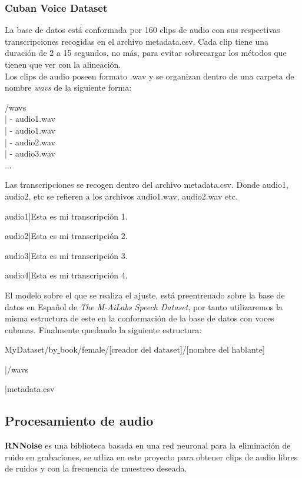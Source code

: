 \subsubsection{Cuban Voice Dataset}
La base de datos está conformada por 160 clips de audio con sus respectivas transcripciones recogidas en el archivo metadata.csv. Cada clip tiene una duración de 2 a 15 segundos, no más, para evitar sobrecargar los métodos que tienen que ver con la alineación.\\

Los clips de audio poseen formato .wav y se organizan dentro de una carpeta de nombre \textit{wavs} de la siguiente forma:

\begin{center}
	/wavs\\
	| - audio1.wav\\
	| - audio1.wav\\
	| - audio2.wav\\
	| - audio3.wav\\
	...
\end{center}

Las transcripciones se recogen dentro del archivo metadata.csv. Donde audio1, audio2, etc se refieren a los archivos audio1.wav, audio2.wav etc.

\begin{center}
	audio1|Esta es mi transcripción 1.
	
	audio2|Esta es mi transcripción 2.
	
	audio3|Esta es mi transcripción 3.
	
	audio4|Esta es mi transcripción 4.
\end{center}

El modelo sobre el que se realiza el ajuste, está preentrenado sobre la base de datos en Español de \textit{The M-AiLabs Speech Dataset}, por tanto utilizaremos la misma estructura de este en la conformación de la base de datos con voces cubanas. Finalmente quedando la siguiente estructura:

\begin{flushleft}
	MyDataset/by$\_$book/female/[creador del dataset]/[nombre del hablante]
	
	|/wavs
	
	|metadata.csv
\end{flushleft}






\subsection{Procesamiento de audio}

\textbf{RNNoise} es una biblioteca basada en una red neuronal para la eliminación de ruido en grabaciones, se utliza en este proyecto para obtener clips de audio libres de ruidos y con la frecuencia de muestreo deseada.











 
